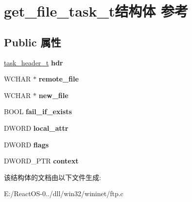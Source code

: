 \hypertarget{structget__file__task__t}{}\section{get\+\_\+file\+\_\+task\+\_\+t结构体 参考}
\label{structget__file__task__t}
\subsection*{Public 属性}
\begin{DoxyCompactItemize}
\item 
\mbox{\label{structget__file__task__t_a4f7b4689f172f52b73786e967879340c}} 
\hyperlink{structtask__header__t}{task\+\_\+header\+\_\+t} {\bfseries hdr}
\item 
\mbox{\label{structget__file__task__t_a96a3a23e744e12f9dc02ccf913ca9cf0}} 
W\+C\+H\+AR $\ast$ {\bfseries remote\+\_\+file}
\item 
\mbox{\label{structget__file__task__t_a3d4654228e7bacf2638512c35a69de45}} 
W\+C\+H\+AR $\ast$ {\bfseries new\+\_\+file}
\item 
\mbox{\label{structget__file__task__t_a903d61449d1276e599789cebaa79c27e}} 
B\+O\+OL {\bfseries fail\+\_\+if\+\_\+exists}
\item 
\mbox{\label{structget__file__task__t_a33d8eb1ca6f19872b7c4ec441e384c50}} 
D\+W\+O\+RD {\bfseries local\+\_\+attr}
\item 
\mbox{\label{structget__file__task__t_a6c860870de4a1458047574232ab85eb1}} 
D\+W\+O\+RD {\bfseries flags}
\item 
\mbox{\label{structget__file__task__t_a6055bda2a4477894f7697c9cd0110f06}} 
D\+W\+O\+R\+D\+\_\+\+P\+TR {\bfseries context}
\end{DoxyCompactItemize}


该结构体的文档由以下文件生成\+:\begin{DoxyCompactItemize}
\item 
E\+:/\+React\+O\+S-\/0../dll/win32/wininet/ftp.\+c\end{DoxyCompactItemize}
